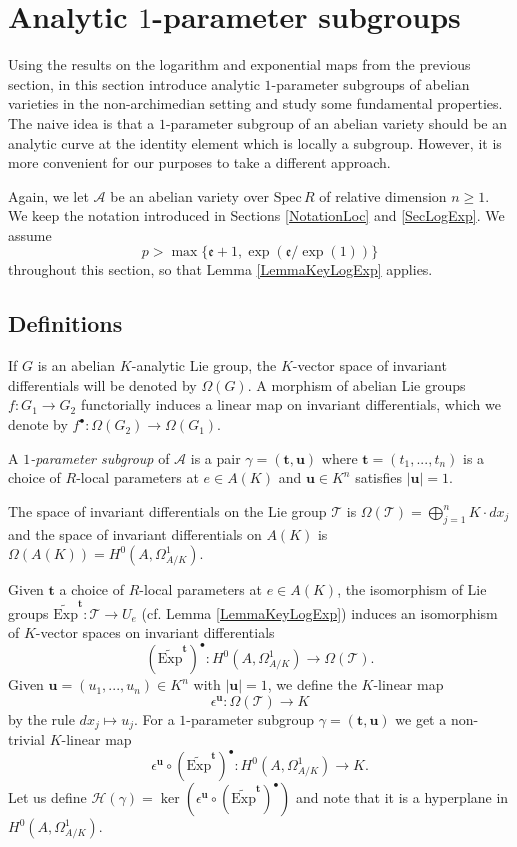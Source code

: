 \documentclass[11pt]{amsart}
\theoremstyle{remark}
\numberwithin{equation}{section}
\newcommand{\efrak}{\mathfrak{e}}
\newcommand{\Acal}{\mathscr{A}}
\newcommand{\Hcal}{\mathscr{H}}
\newcommand{\Tcal}{\mathscr{T}}
\newcommand{\ttt}{\mathbf{t}}
\newcommand{\uu}{\mathbf{u}}
\newcommand{\Spec}{\mathrm{Spec}\,}
\newcommand{\Exp}{\mathrm{Exp}}
\begin{document}

\section{Analytic $1$-parameter subgroups} \label{Sec1PS}

Using the results on the logarithm and exponential maps from the previous section, in this section introduce analytic $1$-parameter subgroups of abelian varieties in the non-archimedian setting and study some fundamental properties. The naive idea is that a $1$-parameter subgroup of an abelian variety should be an analytic curve at the identity element which is locally a subgroup. However, it is more convenient for our purposes to take a different approach.

Again, we let $\Acal$ be an abelian variety over $\Spec R$ of relative dimension $n\ge 1$. We keep the notation introduced in Sections \ref{NotationLoc} and  \ref{SecLogExp}. We assume 
$$
p>\max\{\efrak +1 , \exp(\efrak/\exp(1))\}
$$ 
throughout this section, so that Lemma \ref{LemmaKeyLogExp} applies.

\subsection{Definitions} If $G$ is an abelian $K$-analytic Lie group, the $K$-vector space of invariant differentials will be denoted by $\Omega(G)$. A morphism of abelian Lie groups $f:G_1\to G_2$ functorially induces a linear map on invariant differentials, which we denote by $f^\bullet:\Omega(G_2)\to \Omega(G_1)$.


A \emph{$1$-parameter subgroup} of $\Acal$ is a pair $\gamma=(\ttt,\uu)$ where $\ttt=(t_1,...,t_n)$ is a choice of $R$-local parameters at $e\in A(K)$ and $\uu\in K^n$ satisfies $|\uu|=1$.  


 The space of invariant differentials on the Lie group $\Tcal$ is $\Omega(\Tcal) = \bigoplus_{j=1}^n K\cdot dx_j$ and the space of invariant differentials on $A(K)$ is $ \Omega(A(K))=H^0(A,\Omega^1_{A/K})$. 
 
 Given $\ttt$  a choice of $R$-local parameters at $e\in A(K)$, the isomorphism of Lie groups $\widetilde{\Exp}^\ttt:\Tcal\to U_e$ (cf. Lemma \ref{LemmaKeyLogExp}) induces an isomorphism of $K$-vector spaces on invariant differentials 
\begin{equation}\label{Eqnzxc}
(\widetilde{\Exp}^\ttt)^\bullet : H^0(A,\Omega^1_{A/K})\to \Omega(\Tcal).
\end{equation}
Given $\uu=(u_1,...,u_n)\in K^n$ with $|\uu|=1$, we define the $K$-linear map 
$$
\epsilon^\uu: \Omega(\Tcal)\to K
$$ 
by the rule $dx_j\mapsto u_j$. For a $1$-parameter subgroup $\gamma=(\ttt,\uu)$ we get a non-trivial $K$-linear map 
$$
\epsilon^\uu\circ (\widetilde{\Exp}^\ttt)^\bullet: H^0(A,\Omega^1_{A/K})\to K.
$$
Let us define $\Hcal(\gamma)=\ker(\epsilon^\uu\circ (\widetilde{\Exp}^\ttt)^\bullet)$ and note that it is a hyperplane in $H^0(A,\Omega^1_{A/K})$.
\end{document}

